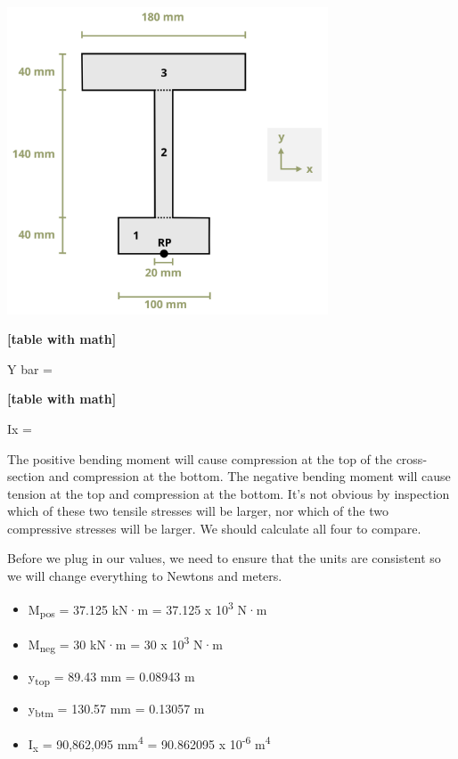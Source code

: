 \documentclass[
  letterpaper,
  DIV=11,
  numbers=noendperiod]{scrreprt}
\begin{document}
\begin{tcolorbox}
\begin{center}
\includegraphics[width=3.75in,height=\textheight]{images/CH9 PNGs/Example 9.2 part 5.png}
\end{center}

\textbf{{[}table with math{]}}

Y bar =

\textbf{{[}table with math{]}}

Ix =

The positive bending moment will cause compression at the top of the
cross-section and compression at the bottom. The negative bending moment
will cause tension at the top and compression at the bottom. It's not
obvious by inspection which of these two tensile stresses will be
larger, nor which of the two compressive stresses will be larger. We
should calculate all four to compare.

Before we plug in our values, we need to ensure that the units are
consistent so we will change everything to Newtons and meters.

\begin{itemize}
\item
  M\textsubscript{pos} = 37.125 kN·m = 37.125 x 10\textsuperscript{3}
  N·m
\item
  M\textsubscript{neg} = 30 kN·m = 30 x 10\textsuperscript{3} N·m
\item
  y\textsubscript{top} = 89.43 mm = 0.08943 m
\item
  y\textsubscript{btm} = 130.57 mm = 0.13057 m
\item
  I\textsubscript{x} = 90,862,095 mm\textsuperscript{4} = 90.862095 x
  10\textsuperscript{-6} m\textsuperscript{4}
\end{itemize}


\end{tcolorbox}
\end{document}

